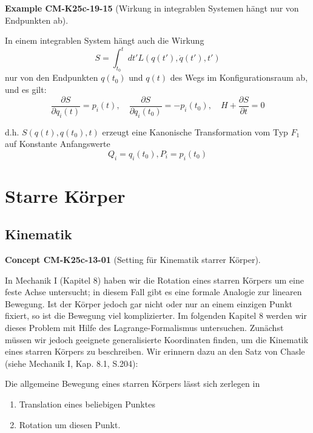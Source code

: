 \documentclass[10pt, letterpaper]{article}
\newcommand{\CustomHeading}[3]{%
  \par\medskip\noindent%
  \textbf{#1 #2} \textnormal{(#3)}.\enskip%
}
\newenvironment{EXA}[2]{\CustomHeading{Example}{#1}{#2}}{}
\newenvironment{CONC}[2]{\CustomHeading{Concept}{#1}{#2}}{}
\begin{document}
\begin{EXA}{CM-K25c-19-15}{Wirkung in integrablen Systemen hängt nur von Endpunkten ab}
In einem integrablen System hängt auch die Wirkung
\[
S = \int_{t_0}^t dt' L(q(t'), \dot{q}(t'), t')
\]
nur von den Endpunkten $q(t_0)$ und $q(t)$ des Wegs im Konfigurationsraum ab, und es gilt:
\[
\frac{\partial S}{\partial q_i(t)} = p_i(t), \quad \frac{\partial S}{\partial q_i(t_0)} = -p_i(t_0), \quad H + \frac{\partial S}{\partial t} = 0
\]

\noindent
d.h. $S(q(t), q(t_0), t)$ erzeugt eine Kanonische Transformation vom Typ $F_1$ auf Konstante Anfangswerte 
$$Q_i = q_i(t_0), P_i = p_i(t_0)$$
\end{EXA}

\section{Starre Körper}

\subsection{Kinematik}

\begin{CONC}{CM-K25c-13-01}{Setting für Kinematik starrer Körper}
In Mechanik I (Kapitel 8) haben wir die Rotation eines starren Körpers um eine feste Achse untersucht; in diesem Fall gibt es eine formale Analogie zur linearen Bewegung. Ist der Körper jedoch gar nicht oder nur an einem einzigen Punkt fixiert, so ist die Bewegung viel komplizierter. Im folgenden Kapitel 8 werden wir dieses Problem mit Hilfe des Lagrange-Formalismus untersuchen. Zunächst müssen wir jedoch geeignete generalisierte Koordinaten finden, um die Kinematik eines starren Körpers zu beschreiben. Wir erinnern dazu an den Satz von Chasle (siehe Mechanik I, Kap. 8.1, S.204):

Die allgemeine Bewegung eines starren Körpers lässt sich zerlegen in
\begin{enumerate}
\item Translation eines beliebigen Punktes
\item Rotation um diesen Punkt.
\end{enumerate}
\end{CONC}
\end{document}
